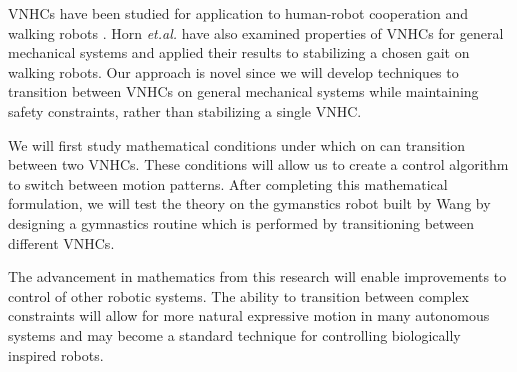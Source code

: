 \documentclass[a4paper,12pt]{article}
\begin{document}
VNHCs have been studied for application to human-robot cooperation
\cite{vnhc-human-robot-coop} and walking robots \cite{vnhc-biped-robot}. Horn
\textit{et.al.} have also examined properties of VNHCs for general mechanical
systems \cite{hybrid_zero_dynamics_bipedal_nhvcs} and applied their results
to stabilizing a chosen gait on walking robots. 
Our approach is novel since we will develop techniques to transition between  
VNHCs on general mechanical systems while maintaining safety constraints, 
rather than stabilizing a single VNHC.

We will first study mathematical conditions under which on can transition
between two VNHCs. These conditions will allow us to create a control algorithm
to switch between motion patterns. After completing this mathematical
formulation, we will test the theory on the gymanstics robot built by Wang
\cite{xingbo-thesis} by designing a gymnastics routine which is performed 
by transitioning between different VNHCs.

The advancement in mathematics from this research will enable improvements to
control of other robotic systems. The ability to transition between complex
constraints will allow for more natural expressive motion in many autonomous
systems and may become a standard technique for controlling biologically
inspired robots.

\printbibliography
\end{document}
